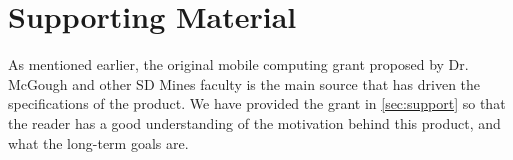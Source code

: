\section{Supporting Material}


As mentioned earlier, the original mobile computing grant proposed by Dr. 
McGough and other SD Mines faculty is the main source that has driven the 
specifications of the product. We have provided the grant in 
\autoref{sec:support} so that the reader has a good understanding of the 
motivation behind this product, and what the long-term goals are.

